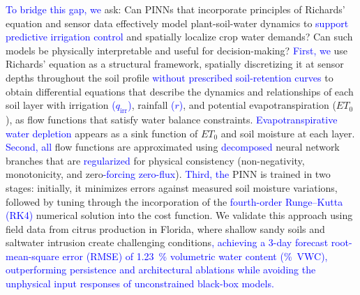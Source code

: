 \documentclass[pdflatex,sn-nature]{sn-jnl}%
\theoremstyle{thmstyleone}%
\theoremstyle{thmstyletwo}%
\theoremstyle{thmstylethree}%
\begin{document}
\textcolor{blue}{To bridge this gap, we} ask: Can PINNs that incorporate principles of Richards' equation and sensor data effectively model plant-soil-water dynamics to \textcolor{blue}{support predictive irrigation control} and spatially localize crop water demands? Can such models be physically interpretable and useful for decision-making? \textcolor{blue}{First, we} use Richards' equation as a structural framework, spatially discretizing it at sensor depths throughout the soil profile \textcolor{blue}{without prescribed soil-retention curves} to obtain differential equations that describe the dynamics and relationships of each soil layer with irrigation \textcolor{blue}{($q_{\mathrm{irr}}$)}, rainfall \textcolor{blue}{($r$)}, and potential evapotranspiration ($ET_0$), as flow functions that satisfy water balance constraints. \textcolor{blue}{Evapotranspirative water depletion} appears as a sink function of $ET_0$ and soil moisture at each layer. \textcolor{blue}{Second, all} flow functions are approximated using \textcolor{blue}{decomposed} neural network branches that are \textcolor{blue}{regularized} for physical consistency (non-negativity, monotonicity, and zero\textcolor{blue}{-forcing zero-flux}). \textcolor{blue}{Third, the} PINN is trained in two stages: initially, it minimizes errors against measured soil moisture variations, followed by tuning through the incorporation of the \textcolor{blue}{fourth-order Runge--Kutta (RK4)} numerical solution into the cost function. We validate this approach using field data from citrus production in Florida, where shallow sandy soils and saltwater intrusion create challenging conditions\textcolor{blue}{, achieving a 3-day forecast root-mean-square error (RMSE) of \SI{1.23}{\%} volumetric water content (\si{\%VWC}), outperforming persistence and architectural ablations while avoiding the unphysical input responses of unconstrained black-box models.}
\end{document}
